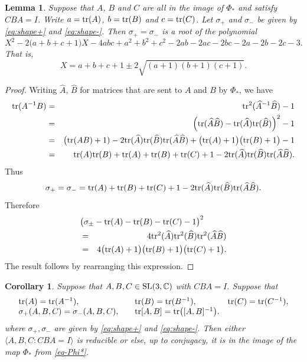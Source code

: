 \documentclass[11pt]{amsart}
\newtheorem{lemma}[theorem]{Lemma}
\newtheorem{corollary}[theorem]{Corollary}
\numberwithin{equation}{section}
\begin{document}
\begin{lemma}\label{lem-shape-irred}
Suppose that $A$, $B$ and $C$ are all in the image of $\Phi_*$ and satisfy $CBA=I$. Write 
$a={\rm tr}(A)$, $b={\rm tr}(B)$ and $c={\rm tr}(C)$. Let 
$\sigma_+$ and $\sigma_-$ be given by \eqref{eq:shape+} and  \eqref{eq:shape-}. Then $\sigma_+=\sigma_-$
is a  root of the polynomial
$$
X^2-2\bigl(a+b+c+1)X-4abc+a^2+b^2+c^2-2ab-2ac-2bc-2a-2b-2c-3.
$$
That is,
$$
X=a+b+c+1\pm 2\sqrt{(a+1)(b+1)(c+1)}.
$$
\end{lemma}

\begin{proof}
Writing $\widehat{A}$, $\widehat{B}$ for matrices that are sent to $A$ and $B$ by $\Phi_*$, we have
\begin{eqnarray*}
{\rm tr}(A^{-1}B) & = & {\rm tr}^2(\widehat{A}^{-1}\widehat{B})-1 \\
& = & \Bigl({\rm tr}(\widehat{A}\widehat{B})-{\rm tr}(\widehat{A}){\rm tr}(\widehat{B})\Bigr)^2-1 \\
& = & \bigl({\rm tr}(AB)+1)-2{\rm tr}(\widehat{A}){\rm tr}(\widehat{B}){\rm tr}(\widehat{A}\widehat{B})
+\bigl({\rm tr}(A)+1\bigr)\bigl({\rm tr}(B)+1\bigr) -1 \\
& = & {\rm tr}(A){\rm tr}(B) +{\rm tr}(A)+{\rm tr}(B)+{\rm tr}(C)+1
-2{\rm tr}(\widehat{A}){\rm tr}(\widehat{B}){\rm tr}(\widehat{A}\widehat{B}).
\end{eqnarray*}
Thus
\begin{equation}\label{eq-shape-irred}
\sigma_+=\sigma_-={\rm tr}(A)+{\rm tr}(B)+{\rm tr}(C)+1
-2{\rm tr}(\widehat{A}){\rm tr}(\widehat{B}){\rm tr}(\widehat{A}\widehat{B}).
\end{equation}
Therefore
\begin{eqnarray*}
\lefteqn{
\bigl(\sigma_\pm -{\rm tr}(A)-{\rm tr}(B)-{\rm tr}(C)-1\bigr)^2 } \\
& = & 4{\rm tr}^2(\widehat{A}){\rm tr}^2(\widehat{B}){\rm tr}^2(\widehat{A}\widehat{B}) \\
& = & 4\bigl({\rm tr}(A)+1\bigr)\bigl({\rm tr}(B)+1\bigr)\bigl({\rm tr}(C)+1\bigr).
\end{eqnarray*}
The result follows by rearranging this expression.
\end{proof}

\medskip

\begin{corollary}\label{cor-irred}
Suppose that $A,B,C\in{\rm SL}(3,{\mathbb C})$ with $CBA=I$. Suppose that 
$$
\begin{array}{lll}
{\rm tr}(A)={\rm tr}(A^{-1}),\quad &{\rm tr}(B)={\rm tr}(B^{-1}),\quad &{\rm tr}(C)={\rm tr}(C^{-1}),\\
\sigma_+(A,B,C)=\sigma_-(A,B,C),\quad &{\rm tr}[A,B]={\rm tr}\bigl([A,B]^{-1}\bigr). &
\end{array}
$$
where $\sigma_+,\sigma_-$ are given by \eqref{eq:shape+} and \eqref{eq:shape-}. 
Then either $\langle A,B,C:CBA=I\rangle$ is reducible or else, up to conjugacy, it is in the image of the map 
$\Phi_*$ from \eqref{eq-Phi*}.
\end{corollary}
\end{document}
